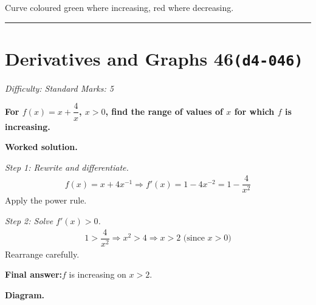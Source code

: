 \documentclass[11pt]{article}
\newcommand{\question}[1]{\par\medskip\noindent\textbf{#1}\par}
\begin{document}
\small Curve coloured green where increasing, red where decreasing.\normalsize

\medskip\hrule

\section*{Derivatives and Graphs 46\quad\small\texttt{(d4-046)}}
\textit{Difficulty: Standard \quad\textbar\quad Marks: 5}

\question{For \( f(x) = x + \dfrac{4}{x} \), \( x > 0 \), find the range of values of \( x \) for which \( f \) is increasing.}

\textbf{Worked solution.}

\textit{Step 1: Rewrite and differentiate.}
\[\begin{gathered}
f(x) = x + 4x^{-1} \Rightarrow f'(x) = 1 - 4x^{-2} = 1 - \dfrac{4}{x^2}
\end{gathered}\]
Apply the power rule.

\textit{Step 2: Solve \( f'(x) > 0 \).}
\[\begin{gathered}
1 > \dfrac{4}{x^2} \Rightarrow x^2 > 4 \Rightarrow x > 2 \text{ (since } x > 0\text{)}
\end{gathered}\]
Rearrange carefully.

\begin{answerbox}
\textbf{Final answer:}\quad \(\displaystyle  f \) is increasing on \(\displaystyle  x > 2 \).
\end{answerbox}
\textbf{Diagram.}
\end{document}
